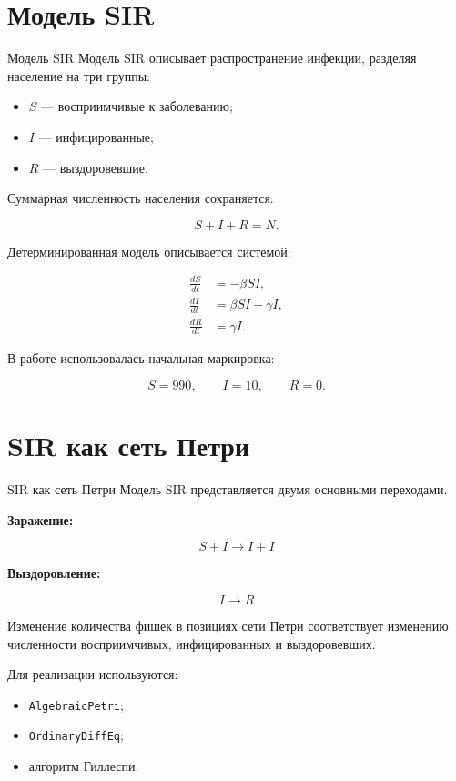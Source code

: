 \documentclass[
  ignorenonframetext,
  aspectratio=169,
  russian,
]{beamer}
\providecommand{\tightlist}{%
  \setlength{\itemsep}{0pt}\setlength{\parskip}{0pt}}
\begin{document}
\section{Модель SIR}\label{ux43cux43eux434ux435ux43bux44c-sir}

\begin{frame}{Модель SIR}
Модель SIR описывает распространение инфекции, разделяя население на три
группы:

\begin{itemize}[<+->]
\tightlist
\item
  \(S\) --- восприимчивые к заболеванию;
\item
  \(I\) --- инфицированные;
\item
  \(R\) --- выздоровевшие.
\end{itemize}

Суммарная численность населения сохраняется:

\[
S+I+R=N.
\]

Детерминированная модель описывается системой:

\[
\begin{aligned}
\frac{dS}{dt} &= -\beta SI, \\
\frac{dI}{dt} &= \beta SI-\gamma I, \\
\frac{dR}{dt} &= \gamma I.
\end{aligned}
\]

В работе использовалась начальная маркировка:

\[
S=990,\qquad I=10,\qquad R=0.
\]
\end{frame}

\section{SIR как сеть
Петри}\label{sir-ux43aux430ux43a-ux441ux435ux442ux44c-ux43fux435ux442ux440ux438}

\begin{frame}[fragile]{SIR как сеть Петри}
Модель SIR представляется двумя основными переходами.

\textbf{Заражение:}

\[
S+I\rightarrow I+I
\]

\textbf{Выздоровление:}

\[
I\rightarrow R
\]

Изменение количества фишек в позициях сети Петри соответствует изменению
численности восприимчивых, инфицированных и выздоровевших.

Для реализации используются:

\begin{itemize}[<+->]
\tightlist
\item
  \texttt{AlgebraicPetri};
\item
  \texttt{OrdinaryDiffEq};
\item
  алгоритм Гиллеспи.
\end{itemize}
\end{frame}
\end{document}
